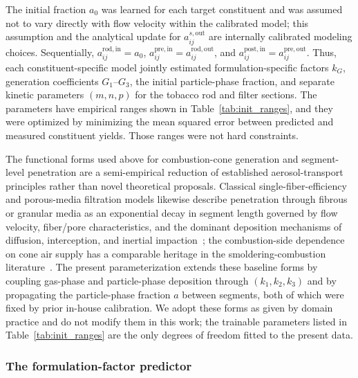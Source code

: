 \documentclass[11pt]{article}
\begin{document}
The initial fraction $a_0$ was learned for each target constituent and was assumed not to vary directly with flow velocity within the calibrated model; this assumption and the analytical update for $a_{ij}^{s,\mathrm{out}}$ are internally calibrated modeling choices. Sequentially, $a_{ij}^{\mathrm{rod},\mathrm{in}}=a_0$, $a_{ij}^{\mathrm{pre},\mathrm{in}}=a_{ij}^{\mathrm{rod},\mathrm{out}}$, and $a_{ij}^{\mathrm{post},\mathrm{in}}=a_{ij}^{\mathrm{pre},\mathrm{out}}$. Thus, each constituent-specific model jointly estimated formulation-specific factors $k_G$, generation coefficients $G_1$--$G_3$, the initial particle-phase fraction, and separate kinetic parameters $(m,n,p)$ for the tobacco rod and filter sections. The parameters have empirical ranges shown in Table~\ref{tab:init_ranges}, and they were optimized by minimizing the mean squared error between predicted and measured constituent yields. Those ranges were not hard constraints.



The functional forms used above for combustion-cone generation and
segment-level penetration are a semi-empirical reduction of established
aerosol-transport principles rather than novel theoretical proposals.
Classical single-fiber-efficiency and porous-media filtration models
likewise describe penetration through fibrous or granular media as an
exponential decay in segment length governed by flow velocity,
fiber/pore characteristics, and the dominant deposition mechanisms of
diffusion, interception, and inertial
impaction~\cite{liu2020particulate,xu2020airfiltering}; the
combustion-side dependence on cone air supply has a comparable
heritage in the smoldering-combustion
literature~\cite{torero2020smouldering}. The present parameterization
extends these baseline forms by coupling gas-phase and particle-phase
deposition through $(k_1, k_2, k_3)$ and by propagating the
particle-phase fraction $a$ between segments, both of which were
fixed by prior in-house calibration. We adopt these forms as given by
domain practice and do not modify them in this work; the trainable
parameters listed in Table~\ref{tab:init_ranges} are the only
degrees of freedom fitted to the present data.

\subsubsection*{The formulation-factor predictor}
\end{document}

